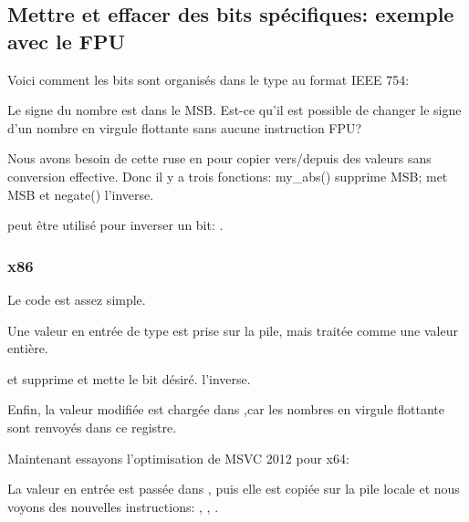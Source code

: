 \subsection{Mettre et effacer des bits spécifiques: exemple avec le \ac{FPU}}


Voici comment les bits sont organisés dans le type \Tfloat au format IEEE 754:



Le signe du nombre est dans le \ac{MSB}.
Est-ce qu'il est possible de changer le signe d'un nombre en virgule flottante sans
aucune instruction FPU?



Nous avons besoin de cette ruse en \CCpp pour copier vers/depuis des valeurs \Tfloat
sans conversion effective.
Donc il y a trois fonctions: my\_abs() supprime \ac{MSB};  met \ac{MSB}
et negate() l'inverse.

\XOR peut être utilisé pour inverser un bit: .

\subsubsection{x86}

Le code est assez simple.



Une valeur en entrée de type \Tfloat est prise sur la pile, mais traitée comme une
valeur entière.

\AND et \OR supprime et mette le bit désiré.
\XOR l'inverse.

Enfin, la valeur modifiée est chargée dans ,car les nombres en virgule flottante
sont renvoyés dans ce registre.

Maintenant essayons l'optimisation de MSVC 2012 pour x64:




La valeur en entrée est passée dans , puis elle est copiée sur la pile locale
et nous voyons des nouvelles instructions: \BTR, \BTS, \BTC.

